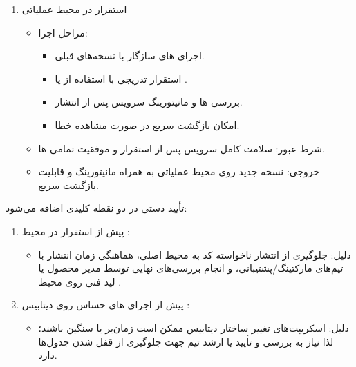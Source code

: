 \begin{enumerate}[label=\arabic*.]
\begin{itemize}
        \item {شرط عبور:}
        دریافت تأییدیه انتشار.

        \item {خروجی:}
        مجوز آغاز استقرار در محیط عملیاتی.
    \end{itemize}

    \item {استقرار در محیط عملیاتی}
    \begin{itemize}
        \item {مراحل اجرا:}
        \begin{itemize}
            \item اجرای های سازگار با نسخه‌های قبلی.
            \item استقرار تدریجی با استفاده از  یا .
            \item بررسی ها و مانیتورینگ سرویس پس از انتشار.
            \item امکان بازگشت سریع در صورت مشاهده خطا.
        \end{itemize}

        \item {شرط عبور:}
        سلامت کامل سرویس پس از استقرار و موفقیت تمامی ها.

        \item {خروجی:}
        نسخه جدید روی محیط عملیاتی به همراه مانیتورینگ و قابلیت بازگشت سریع.
    \end{itemize}

\end{enumerate}


تأیید دستی در دو نقطه کلیدی اضافه می‌شود:
\begin{enumerate}
    \item {پیش از استقرار در محیط :} 
    \begin{itemize}
        \item {دلیل:} جلوگیری از انتشار ناخواسته کد به محیط اصلی، هماهنگی زمان انتشار با تیم‌های مارکتینگ/پشتیبانی، و انجام بررسی‌های نهایی توسط مدیر محصول یا لید فنی روی محیط .
    \end{itemize}
    \item {پیش از اجرای های حساس روی دیتابیس :}
    \begin{itemize}
        \item {دلیل:} اسکریپت‌های تغییر ساختار دیتابیس ممکن است زمان‌بر یا سنگین باشند؛ لذا نیاز به بررسی و تأیید  یا ارشد تیم جهت جلوگیری از قفل شدن جدول‌ها دارد.
    \end{itemize}
\end{enumerate}

